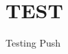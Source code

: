 \documentclass[10pt, a4paper, twoside]{report}
\begin{document}
\section{TEST}
Testing Push
\end{document}
